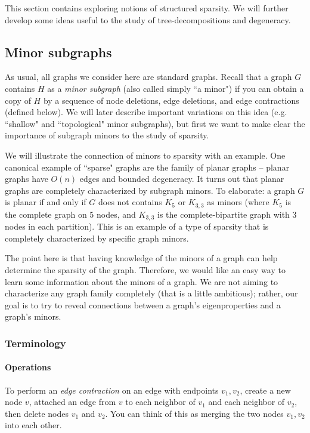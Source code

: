 
This section contains exploring notions of structured sparsity. We will further develop some ideas useful to the study of tree-decompositions and degeneracy.

\subsection{Minor subgraphs}\label{sec:minors}

As usual, all graphs we consider here are standard graphs.
Recall that a graph $G$ contains $H$ as a \emph{minor subgraph} (also called simply ``a minor") if you can obtain a copy of $H$ by a sequence of node deletions, edge deletions, and edge contractions (defined below).
We will later describe important variations on this idea (e.g. ``shallow" and ``topological" minor subgraphs), but first we want to make clear the importance of subgraph minors to the study of sparsity.

We will illustrate the connection of minors to sparsity with an example.
One canonical example of ``sparse" graphs are the family of planar graphs -- planar graphs have $O(n)$ edges and bounded degeneracy.
It turns out that planar graphs are completely characterized by subgraph minors.
To elaborate: a graph $G$ is planar if and only if $G$ does not contains $K_5$ or $K_{3,3}$ as minors (where $K_5$ is the complete graph on 5 nodes, and $K_{3,3}$ is the complete-bipartite graph with 3 nodes in each partition).
This is an example of a type of sparsity that is completely characterized by specific graph minors.

The point here is that having knowledge of the minors of a graph can help determine the sparsity of the graph.
Therefore, we would like an easy way to learn some information about the minors of a graph.
We are not aiming to characterize any graph family completely (that is a little ambitious); rather, our goal is to try to reveal connections between a graph's eigenproperties and a graph's minors.


\subsubsection{Terminology}

\paragraph{Operations}

To perform an \emph{edge contraction} on an edge with endpoints $v_1, v_2$, create a new node $v$, attached an edge from $v$ to each neighbor of $v_1$ and each neighbor of $v_2$, then delete nodes $v_1$ and $v_2$. You can think of this as merging the two nodes $v_1, v_2$ into each other.

